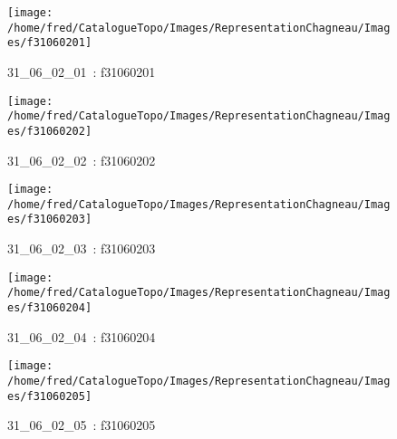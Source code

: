 \documentclass[12pt,titlepage]{book}
\begin{document}
\begin{figure}[h!]
  \hfill         %
  \begin{minipage}[t]{3cm}
    \begin{center}
      \texttt{[image: /home/fred/CatalogueTopo/Images/RepresentationChagneau/Images/f31060201]}
      \caption[~31\_06\_02\_01]{\small{31\_06\_02\_01~:} \tiny{f31060201}}\label{f31060201}
    \end{center}
  \end{minipage}
  \begin{minipage}[t]{3cm}
    \begin{center}
      \texttt{[image: /home/fred/CatalogueTopo/Images/RepresentationChagneau/Images/f31060202]}
      \caption[~31\_06\_02\_02]{\small{31\_06\_02\_02~:} \tiny{f31060202}}\label{f31060202}
    \end{center}
  \end{minipage}
  \begin{minipage}[t]{3cm}
    \begin{center}
      \texttt{[image: /home/fred/CatalogueTopo/Images/RepresentationChagneau/Images/f31060203]}
      \caption[~31\_06\_02\_03]{\small{31\_06\_02\_03~:} \tiny{f31060203}}\label{f31060203}
    \end{center}
  \end{minipage}
  \begin{minipage}[t]{3cm}
    \begin{center}
      \texttt{[image: /home/fred/CatalogueTopo/Images/RepresentationChagneau/Images/f31060204]}
      \caption[~31\_06\_02\_04]{\small{31\_06\_02\_04~:} \tiny{f31060204}}\label{f31060204}
    \end{center}
  \end{minipage}
  \begin{minipage}[t]{3cm}
    \begin{center}
      \texttt{[image: /home/fred/CatalogueTopo/Images/RepresentationChagneau/Images/f31060205]}
      \caption[~31\_06\_02\_05]{\small{31\_06\_02\_05~:} \tiny{f31060205}}\label{f31060205}
    \end{center}
  \end{minipage}
  \begin{minipage}[t]{3cm}

\end{minipage}
\end{figure}
\end{document}
